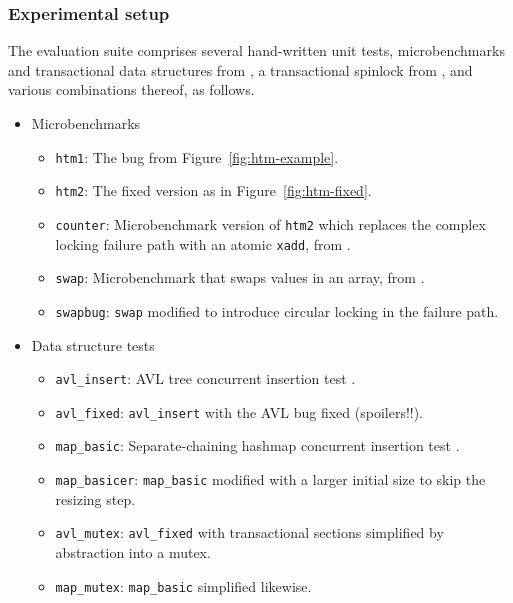 \subsubsection{Experimental setup}

The evaluation suite comprises several hand-written unit tests,
microbenchmarks and transactional data structures from \cite{tm-benchmark-cmu},
a transactional spinlock from \cite{spinlock-rtm-github},
and various combinations thereof,
as follows.


\begin{itemize}
	\item Microbenchmarks
	\begin{itemize}
		\item {\tt htm1}: The bug from Figure~\ref{fig:htm-example}. %
		\item {\tt htm2}: The fixed version as in Figure~\ref{fig:htm-fixed}.
		\item {\tt counter}: Microbenchmark version of {\tt htm2} which replaces the complex locking failure path with an atomic {\tt xadd}, from \cite{tm-benchmark-cmu}.
		\item {\tt swap}: Microbenchmark that swaps values in an array, from \cite{tm-benchmark-cmu}.
		\item {\tt swapbug}: {\tt swap} modified to introduce circular locking in the failure path. %
	\end{itemize}
	\item Data structure tests
	\begin{itemize}
		\item {\tt avl\_insert}: AVL tree concurrent insertion test \cite{tm-benchmark-cmu}.
		\item {\tt avl\_fixed}: {\tt avl\_insert} with the AVL bug fixed (spoilers!!).
		\item {\tt map\_basic}: Separate-chaining hashmap concurrent insertion test \cite{tm-benchmark-cmu}.
		\item {\tt map\_basicer}: {\tt map\_basic} modified with a larger initial size to skip the resizing step.
		\item {\tt avl\_mutex}: {\tt avl\_fixed} with transactional sections simplified by abstraction into a mutex.
		\item {\tt map\_mutex}: {\tt map\_basic} simplified likewise.

\end{itemize}
\end{itemize}
